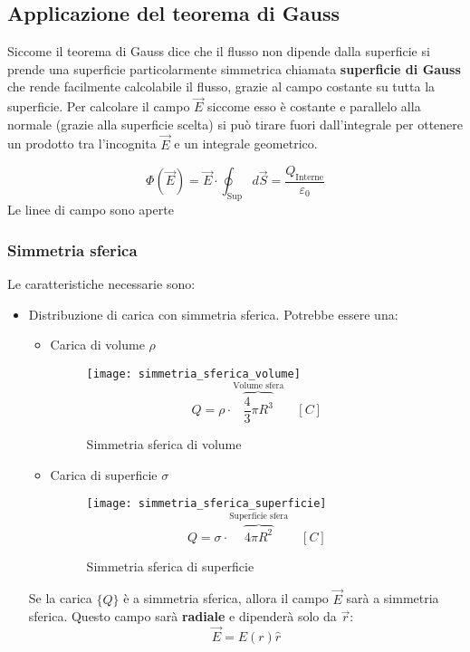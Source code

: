 \documentclass[a4paper]{article}
\begin{document}
\subsection{Applicazione del teorema di Gauss}
Siccome il teorema di Gauss dice che il flusso non dipende dalla superficie si prende
una superficie particolarmente simmetrica chiamata \textbf{superficie di Gauss} che
rende facilmente calcolabile il flusso, grazie al campo costante su tutta la superficie.
Per calcolare il campo \( \vec{E} \) siccome esso è costante e parallelo alla normale
(grazie alla superficie scelta) si può tirare fuori dall'integrale per ottenere un
prodotto tra l'incognita \( \vec{E} \) e un integrale geometrico.
\begin{definition}
  \[
    \Phi (\vec{E}) = \vec{E} \cdot \oint_{\text{Sup}} d \vec{S} =
    \frac{Q_{\text{Interne}}}{\varepsilon_0}
  \] 
  Le linee di campo sono aperte
\end{definition}
\subsubsection{Simmetria sferica}
Le caratteristiche necessarie sono:
\begin{itemize}
  \item Distribuzione di carica con simmetria sferica. Potrebbe essere una:
    \begin{itemize}
      \item Carica di volume \( \rho \)
        \begin{figure}[H]
          \centering
          \texttt{[image: simmetria\_sferica\_volume]}
          \[
            Q = \rho \cdot \overbrace{\frac{4}{3}\pi R^3}^{\text{Volume sfera}}
            \quad \left[C\right]
          \] 
          \caption{Simmetria sferica di volume}
        \end{figure}
      \item Carica di superficie \( \sigma \)
        \begin{figure}[H]
          \centering
          \texttt{[image: simmetria\_sferica\_superficie]}
          \[
            Q = \sigma \cdot \overbrace{4 \pi R^2}^{\text{Superficie sfera}}
            \quad \left[C\right]
          \] 
          \caption{Simmetria sferica di superficie}
        \end{figure}
    \end{itemize}
    Se la carica \( \{Q\} \) è a simmetria sferica, allora il campo \( \vec{E} \) sarà
    a simmetria sferica. Questo campo sarà \textbf{radiale} e dipenderà solo da \( \vec{r} \):
    \[
      \vec{E} = E(r) \hat{r}
    \] 
\end{itemize}
\end{document}
